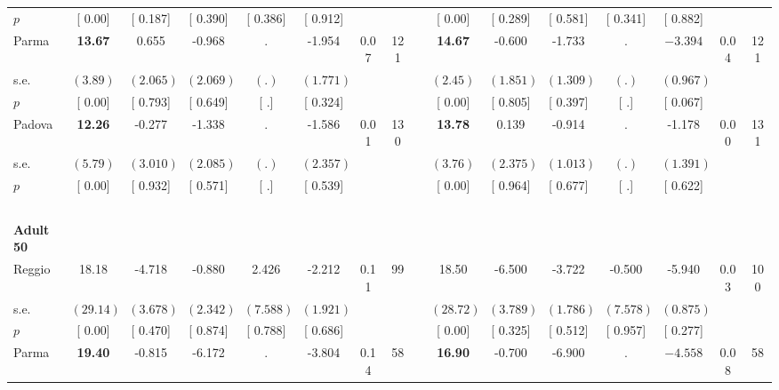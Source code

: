 \begin{longtable}{L{8em} c c c c c c c p{1em} c c c c c c c}
\quad \quad \quad \quad $ p$ & [     0.00] & [    0.187] & [    0.390] & [    0.386] & [    0.912] & & & & [     0.00] & [    0.289] & [    0.581] & [    0.341] & [    0.882] & &  \\[1em]
\quad \quad \quad Parma& \textbf{    13.67} &     0.655 &    -0.968 &         . &    -1.954 &      0.07 &       121 & & \textbf{    14.67} &    -0.600 &    -1.733 &         . & $ \mathbf{   -3.394}$ &      0.04 &       121  \\*
\quad \quad \quad \quad s.e.& $ (     3.89)$ & $ (    2.065)$ & $ (    2.069)$ & $ (        .)$ & $ (    1.771)$ & & & & $ (     2.45)$ & $ (    1.851)$ & $ (    1.309)$ & $ (        .)$ & $ (    0.967)$ & &  \\*
\quad \quad \quad \quad $ p$ & [     0.00] & [    0.793] & [    0.649] & [        .] & [    0.324] & & & & [     0.00] & [    0.805] & [    0.397] & [        .] & [    0.067] & &  \\[1em]
\quad \quad \quad Padova& \textbf{    12.26} &    -0.277 &    -1.338 &         . &    -1.586 &      0.01 &       130 & & \textbf{    13.78} &     0.139 &    -0.914 &         . &    -1.178 &      0.00 &       131  \\*
\quad \quad \quad \quad s.e.& $ (     5.79)$ & $ (    3.010)$ & $ (    2.085)$ & $ (        .)$ & $ (    2.357)$ & & & & $ (     3.76)$ & $ (    2.375)$ & $ (    1.013)$ & $ (        .)$ & $ (    1.391)$ & &  \\*
\quad \quad \quad \quad $ p$ & [     0.00] & [    0.932] & [    0.571] & [        .] & [    0.539] & & & & [     0.00] & [    0.964] & [    0.677] & [        .] & [    0.622] & &  \\[1em]
~\\[1em]
\quad \quad \textbf{Adult 50} & & & & & & & & & & & & & & & \\* 
\quad \quad \quad Reggio& 18.18 &    -4.718 &    -0.880 &     2.426 &    -2.212 &      0.11 &        99 & & 18.50 &    -6.500 &    -3.722 &    -0.500 &    -5.940 &      0.03 &       100  \\*
\quad \quad \quad \quad s.e.& $ (    29.14)$ & $ (    3.678)$ & $ (    2.342)$ & $ (    7.588)$ & $ (    1.921)$ & & & & $ (    28.72)$ & $ (    3.789)$ & $ (    1.786)$ & $ (    7.578)$ & $ (    0.875)$ & &  \\*
\quad \quad \quad \quad $ p$ & [     0.00] & [    0.470] & [    0.874] & [    0.788] & [    0.686] & & & & [     0.00] & [    0.325] & [    0.512] & [    0.957] & [    0.277] & &  \\[1em]
\quad \quad \quad Parma& \textbf{    19.40} &    -0.815 &    -6.172 &         . &    -3.804 &      0.14 &        58 & & \textbf{    16.90} &    -0.700 &    -6.900 &         . & $ \mathbf{   -4.558}$ &      0.08 &        58  \\*

\end{longtable}
